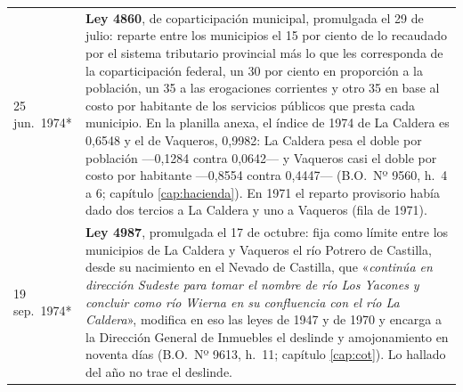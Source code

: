 \begin{longtable}{@{}p{2.7cm}p{10.3cm}@{}}
25 jun.\ 1974* & \textbf{Ley 4860}, de coparticipación municipal, promulgada el 29 de julio: reparte entre los municipios el 15 por ciento de lo recaudado por el sistema tributario provincial más lo que les corresponda de la coparticipación federal, un 30 por ciento en proporción a la población, un 35 a las erogaciones corrientes y otro 35 en base al costo por habitante de los servicios públicos que presta cada municipio. En la planilla anexa, el índice de 1974 de La Caldera es 0,6548 y el de Vaqueros, 0,9982: La Caldera pesa el doble por población ---0,1284 contra 0,0642--- y Vaqueros casi el doble por costo por habitante ---0,8554 contra 0,4447--- (B.O.\ Nº 9560, h.\ 4 a 6; capítulo \ref{cap:hacienda}). En 1971 el reparto provisorio había dado dos tercios a La Caldera y uno a Vaqueros (fila de 1971). \\
19 sep.\ 1974* & \textbf{Ley 4987}, promulgada el 17 de octubre: fija como límite entre los municipios de La Caldera y Vaqueros el río Potrero de Castilla, desde su nacimiento en el Nevado de Castilla, que «\textit{continúa en dirección Sudeste para tomar el nombre de río Los Yacones y concluir como río Wierna en su confluencia con el río La Caldera}», modifica en eso las leyes de 1947 y de 1970 y encarga a la Dirección General de Inmuebles el deslinde y amojonamiento en noventa días (B.O.\ Nº 9613, h.\ 11; capítulo \ref{cap:cot}). Lo hallado del año no trae el deslinde. \\

\end{longtable}
